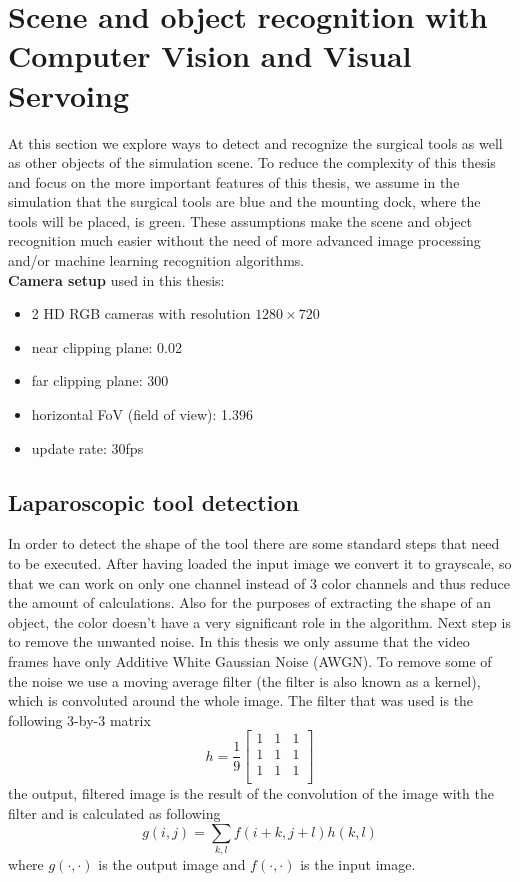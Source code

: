 \section{Scene and object recognition with Computer Vision and Visual Servoing}

At this section we explore ways to detect and recognize the surgical tools as well as other objects of the simulation scene. To reduce the complexity of 
this thesis and focus on the more important features of this thesis, we assume in the simulation that the surgical tools are blue and the mounting dock, 
where the tools will be placed, is green. These assumptions make the scene and object recognition much easier without the need of more advanced image 
processing and/or machine learning recognition algorithms.\\

\textbf{Camera setup} used in this thesis:
\begin{itemize}
\item 2 HD RGB cameras with resolution $1280 \times 720$
\item near clipping plane: 0.02
\item far clipping plane: 300 
\item horizontal FoV (field of view): 1.396
\item update rate: 30fps
\end{itemize}

\subsection{Laparoscopic tool detection}

In order to detect the shape of the tool there are some standard steps that need to be executed. After having loaded the input image we convert it to grayscale, so that we can work on only one channel instead of
3 color channels and thus reduce the amount of calculations. Also for the purposes of extracting the shape of an object, the color doesn't have a very significant role in the algorithm. Next step is 
to remove the unwanted noise. In this thesis we only assume that the video frames have only Additive White Gaussian Noise (AWGN). To remove some of the
noise we use a moving average filter (the filter is also known as a kernel), which is convoluted around the whole image. The filter that was used is the following 3-by-3 matrix
\[
h = \frac{1}{9} \begin{bmatrix}
1 & 1 & 1 \\
1 & 1 & 1 \\
1 & 1 & 1 \\
\end{bmatrix}
\]
the output, filtered image is the result of the convolution of the image with the filter and is calculated as following
\[
g(i,j) = \sum_{k,l} f(i+k,j+l)h(k,l)
\]
where $g(\cdot, \cdot)$ is the output image and $f(\cdot, \cdot)$ is the input image.

